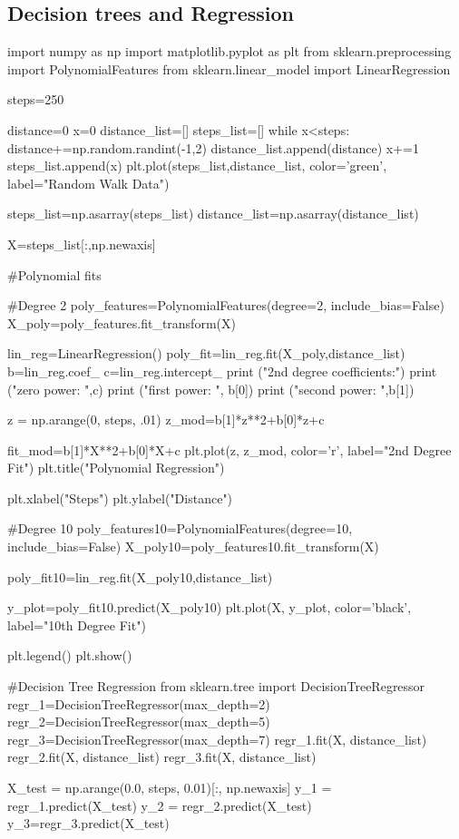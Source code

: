 \documentclass[%
oneside,                 %
final,                   %
10pt]{article}
\begin{document}
\subsection{Decision trees and Regression}
\bpycod
import numpy as np
import matplotlib.pyplot as plt
from sklearn.preprocessing import PolynomialFeatures
from sklearn.linear_model import LinearRegression

steps=250

distance=0
x=0
distance_list=[]
steps_list=[]
while x<steps:
    distance+=np.random.randint(-1,2)
    distance_list.append(distance)
    x+=1
    steps_list.append(x)
plt.plot(steps_list,distance_list, color='green', label="Random Walk Data")

steps_list=np.asarray(steps_list)
distance_list=np.asarray(distance_list)

X=steps_list[:,np.newaxis]

#Polynomial fits

#Degree 2
poly_features=PolynomialFeatures(degree=2, include_bias=False)
X_poly=poly_features.fit_transform(X)

lin_reg=LinearRegression()
poly_fit=lin_reg.fit(X_poly,distance_list)
b=lin_reg.coef_
c=lin_reg.intercept_
print ("2nd degree coefficients:")
print ("zero power: ",c)
print ("first power: ", b[0])
print ("second power: ",b[1])

z = np.arange(0, steps, .01)
z_mod=b[1]*z**2+b[0]*z+c

fit_mod=b[1]*X**2+b[0]*X+c
plt.plot(z, z_mod, color='r', label="2nd Degree Fit")
plt.title("Polynomial Regression")

plt.xlabel("Steps")
plt.ylabel("Distance")

#Degree 10
poly_features10=PolynomialFeatures(degree=10, include_bias=False)
X_poly10=poly_features10.fit_transform(X)

poly_fit10=lin_reg.fit(X_poly10,distance_list)

y_plot=poly_fit10.predict(X_poly10)
plt.plot(X, y_plot, color='black', label="10th Degree Fit")

plt.legend()
plt.show()


#Decision Tree Regression
from sklearn.tree import DecisionTreeRegressor
regr_1=DecisionTreeRegressor(max_depth=2)
regr_2=DecisionTreeRegressor(max_depth=5)
regr_3=DecisionTreeRegressor(max_depth=7)
regr_1.fit(X, distance_list)
regr_2.fit(X, distance_list)
regr_3.fit(X, distance_list)

X_test = np.arange(0.0, steps, 0.01)[:, np.newaxis]
y_1 = regr_1.predict(X_test)
y_2 = regr_2.predict(X_test)
y_3=regr_3.predict(X_test)
\end{document}
